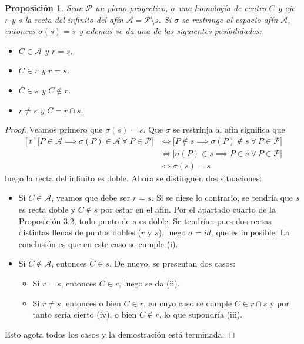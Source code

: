 \documentclass[12pt]{report}
\newtheorem{proposition}{Proposición}[chapter]
\theoremstyle{definition}
\theoremstyle{definition}
\theoremstyle{remark}
\begin{document}
\begin{proposition}
\label{prop3.4.}
Sean $\mathcal{P}$ un plano proyectivo, $\sigma$ una homología de centro $C$ y eje $r$ y $s$ la recta del infinito del afín $\mathcal{A} = \mathcal{P} \setminus s$. Si $\sigma$ se restringe al espacio afín $\mathcal{A}$, entonces $\sigma(s) = s$ y además se da una de las siguientes posibilidades:
\begin{itemize}
    \item[(i)] $C \in \mathcal{A}$ y $r = s$.
    \item[(ii)] $C \in r$ y $r = s$.
    \item[(iii)] $C \in s$ y $C \notin r$.
    \item[(iv)] $r \neq s$ y $C = r \cap s$.
\end{itemize}
\end{proposition}
\begin{proof}
Veamos primero que $\sigma(s) = s$. Que $\sigma$ se restrinja al afín significa que
\[
\begin{aligned}[t]
\biggl[ P \in \mathcal{A} \implies \sigma(P) \in \mathcal{A} \ \forall \ P \in \mathcal{P}\biggr] &\iff \biggl[ P \notin s \implies \sigma(P) \notin s \ \forall \ P \in \mathcal{P}\biggr] \\
&\iff \biggl[ \sigma(P) \in s \implies P \in s \ \forall \ P \in \mathcal{P}\biggr] \\
&\iff \sigma(s) = s
\end{aligned}
\]
luego la recta del infinito es doble. Ahora se distinguen dos situaciones:
\begin{itemize}
    \item[I.] Si $C \in \mathcal{A}$, veamos que debe ser $r = s$. Si se diese lo contrario, se tendría que $s$ es recta doble y $C \notin s$ por estar en el afín. Por el apartado cuarto de la \hyperref[prop3.2.]{\color{blue}Proposición 3.2}, todo punto de $s$ es doble. Se tendrían pues dos rectas distintas llenas de puntos dobles ($r$ y $s$), luego $\sigma = id$, que es imposible. La conclusión es que en este caso se cumple (i).
    \item[II.] Si $C \notin \mathcal{A}$, entonces $C \in s$. De nuevo, se presentan dos casos:
    \begin{itemize}
        \item[II.1.] Si $r = s$, entonces $C \in r$, luego se da (ii).
        \item[II.2.] Si $r \neq s$, entonces o bien $C \in r$, en cuyo caso se cumple $C \in r \cap s$ y por tanto sería cierto (iv), o bien $C \notin r$, lo que supondría (iii).
    \end{itemize}
\end{itemize}
Esto agota todos los casos y la demostración está terminada.
\end{proof}
\end{document}
